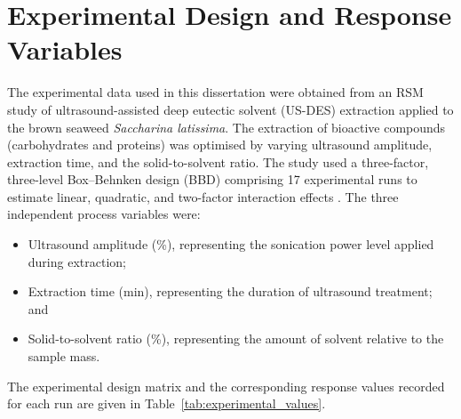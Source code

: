 \documentclass[MScDSA]{uccthesis}
\begin{document}
\section{Experimental Design and Response Variables}
\label{sec:experimental_design}
The experimental data used in this dissertation were obtained from an RSM study of ultrasound-assisted deep eutectic solvent (US-DES) extraction applied to the brown seaweed \textit{Saccharina latissima}. The extraction of bioactive compounds (carbohydrates and proteins) was optimised by varying ultrasound amplitude, extraction time, and the solid-to-solvent ratio. The study used a three-factor, three-level Box--Behnken design (BBD) comprising 17 experimental runs to estimate linear, quadratic, and two-factor interaction effects \parencite{Box:1960}. The three independent process variables were:
\begin{itemize}
    \item[$A$:] Ultrasound amplitude (\%), representing the sonication power level applied during extraction;
    \item[$B$:] Extraction time (min), representing the duration of ultrasound treatment; and
    \item[$C$:] Solid-to-solvent ratio (\%), representing the amount of solvent relative to the sample mass.
\end{itemize}

The experimental design matrix and the corresponding response values recorded for each run are given in Table~\ref{tab:experimental_values}.
\end{document}
